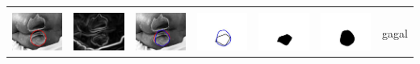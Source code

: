 \begin{table}[H]
\begin{tabular}{|m{0.7in}|m{0.7in}|m{0.7in}|m{0.7in}|m{0.7in}|m{0.7in}|m{0.7in}|}
		&  &  & & & &  \\
		\includegraphics[width=0.7in]{dataset/dataset_3/luka_merah/ready/36_interp_init.jpg}&
		\includegraphics[width=0.7in]{dataset/dataset_3/luka_merah/ready/36_interp_ext.jpg}&
		\includegraphics[width=0.7in]{dataset/dataset_3/luka_merah/ready/36_interp_result.jpg}&
		\includegraphics[width=0.7in]{dataset/dataset_3/luka_merah/ready/36_gt_r.jpg}&
		\includegraphics[width=0.7in]{dataset/dataset_3/luka_merah/ready/36_r.jpg}&
		\includegraphics[width=0.7in]{dataset/dataset_3/luka_merah/ready/36_interp_r.jpg}&
		gagal\\
		\hline
		

\end{tabular}
\end{table}
